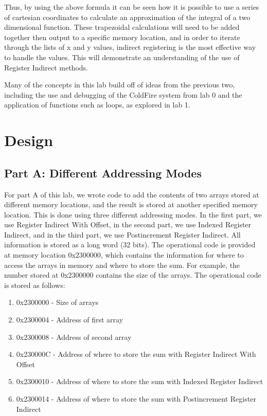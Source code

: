 \documentclass[letterpaper]{article}
\begin{document}
  Thus, by using the above formula it can be seen how it is possible to use a series of
  cartesian coordinates to calculate an approximation of the integral of a two
  dimensional function. These trapezoidal calculations will need to be added together
  then output to a specific memory location, and in order to iterate through the lists
  of x and y values, indirect registering is the most effective way to handle the values.
  This will demonstrate an understanding of the use of Register Indirect methods.

  Many of the concepts in this lab build off of ideas from the previous two, including the
  use and debugging of the ColdFire system from lab 0 and the application of functions such
  as loops, as explored in lab 1.


\section{Design}

\subsection{Part A: Different Addressing Modes}
For part A of this lab, we wrote code to add the contents of two arrays
stored at different memory locations, and the result is stored at another
specified memory location. This is done using three  different addressing modes.
In the first part, we use Register Indirect With Offset, in the second part, we
use Indexed Register Indirect, and in the third part, we use Postincrement
Register Indirect. All information is stored as a long word (32 bits). The
operational code is provided at memory location 0x2300000, which contains the
information for where to access the arrays in memory and where to store the sum.
For example, the number stored at 0x2300000 contains the size of the arrays. The
operational code is stored as follows:

    \begin{enumerate}
      \item 0x2300000 - Size of arrays
      \item 0x2300004 - Address of first array
      \item 0x2300008 - Address of second array
      \item 0x230000C - Address of where to store the sum with Register Indirect With Offset
      \item 0x2300010 - Address of where to store the sum with Indexed Register Indirect
      \item 0x2300014 - Address of where to store the sum with Postincrement Register Indirect
    \end{enumerate}
\end{document}
